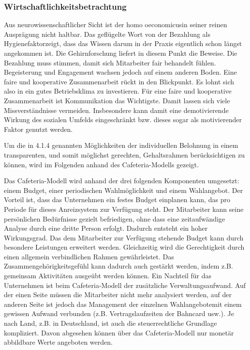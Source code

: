 \subsubsection{Wirtschaftlichkeitsbetrachtung}
\glqq Aus neurowissenschaftlicher Sicht ist der \glqq homo oeconomicus\grqq in seiner reinen Ausprägung nicht haltbar. Das geflügelte Wort von \glqq der Bezahlung als Hygienefaktor\grqq zeigt, dass das Wissen darum in der Praxis eigentlich schon längst angekommen ist. Die Gehirnforschung liefert in diesem Punkt die Beweise. Die Bezahlung muss stimmen, damit sich Mitarbeiter fair behandelt fühlen. Begeisterung und Engagement wachsen jedoch auf einem anderen Boden. Eine faire und kooperative Zusammenarbeit rückt in den Blickpunkt. Es lohnt sich also in ein gutes Betriebsklima zu investieren.\grqq \cite[S. 19]{Seelbach.2011} Für eine faire und kooperative Zusammenarbeit ist Kommunikation das Wichtigste. Damit lassen sich viele Missverständnisse vermeiden. Insbesondere kann damit eine demotivierende Wirkung des sozialen Umfelds eingeschränkt bzw. dieses sogar als motivierender Faktor genutzt werden. 

Um die in 4.1.4 genannten Möglichkeiten der individuellen Belohnung in einem transparenten, und somit möglichst gerechten, Gehaltsrahmen berücksichtigen zu können, wird im Folgenden anhand des Cafeteria-Modells gezeigt.

Das Cafeteria-Modell wird anhand der drei folgenden Komponenten umgesetzt: einem Budget, einer periodischen Wahlmöglichkeit und einem Wahlangebot.
Der Vorteil ist, dass das Unternehmen ein festes Budget einplanen kann, das pro Periode für dieses Anreizsystem zur Verfügung steht. Der Mitarbeiter kann seine persönlichen Bedürfnisse gezielt befriedigen, ohne dass eine zeitaufwändige Analyse durch eine dritte Person erfolgt. Dadurch entsteht ein hoher Wirkungsgrad. Das dem Mitarbeiter zur Verfügung stehende Budget kann durch besondere Leistungen erweitert werden.
Gleichzeitig wird die Gerechtigkeit durch einen allgemein verbindlichen Rahmen gewährleistet. Das Zusammengehörigkeitsgefühl kann dadurch auch gestärkt werden, indem z.B. gemeinsam Aktivitäten ausgeübt werden können. Ein Nachteil für das Unternehmen ist beim Cafeteria-Modell der zusätzliche Verwaltungsaufwand. Auf der einen Seite müssen die Mitarbeiter nicht mehr analysiert werden, auf der anderen Seite ist jedoch das Management der einzelnen \glqq Wahlangebote\grqq mit einem gewissen Aufwand verbunden (z.B. Vertragslaufzeiten der Bahncard usw.).
Je nach Land, z.B. in Deutschland, ist auch die steuerrechtliche Grundlage kompliziert. 
Davon abgesehen können über das Cafeteria-Modell nur monetär abbildbare Werte angeboten werden. \citep[S. 55ff]{Nowka.2013}

